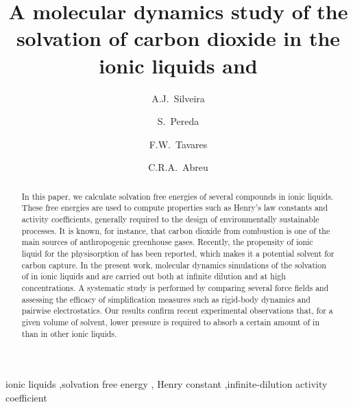 \documentclass[3p,twocolumn]{elsarticle}
\begin{document}
\begin{frontmatter}

\title{A molecular dynamics study of the solvation of carbon dioxide in the ionic liquids \ce{[emim][B(CN)_4]} and \ce{[emim][NTf_2]}}

\author[plapiqui,msk]{A.J.~Silveira}
\author[plapiqui]{S.~Pereda}
\author[eq-ufrj,coppe-ufrj]{F.W.~Tavares}
\author[eq-ufrj]{C.R.A.~Abreu}

\address[plapiqui]{Planta Piloto de Ingenier\'ia Qu\'imica (PLAPIQUI), Universidad Nacional del Sur, Bah\'ia Blanca, Argentina}
\address[msk]{Computational \& Systems Biology Program, Memorial Sloan Kettering Cancer Center, New York, NY, USA}
\address[eq-ufrj]{Chemical Engineering Department, Escola de Qu\'imica, Universidade Federal do Rio de Janeiro, Rio de Janeiro, Brazil}
\address[coppe-ufrj]{Chemical Engineering Program, Alberto Luiz Coimbra Institute for Graduate Studies and Research in Engineering (COPPE), Universidade Federal do Rio de Janeiro, Rio de Janeiro, Brazil}


\begin{abstract}
In this paper, we calculate solvation free energies of several compounds in ionic liquids.
These free energies are used to compute properties such as Henry's law constants and activity coefficients, generally required to the design of environmentally sustainable processes.
It is known, for instance, that carbon dioxide from combustion is one of the main sources of anthropogenic greenhouse gases.
Recently, the propensity of ionic liquid \ce{[emim][B(CN)_4]} for the physisorption of  has been reported, which makes it a potential solvent for carbon capture.
In the present work, molecular dynamics simulations of the solvation of  in ionic liquids \ce{[emim][B(CN)_4]} and \ce{[emim][NTf_2]} are carried out both at infinite dilution and at high concentrations.
A systematic study is performed by comparing several force fields and assessing the efficacy of simplification measures such as rigid-body dynamics and pairwise electrostatics.
Our results confirm recent experimental observations that, for a given volume of solvent, lower pressure is required to absorb a certain amount of  in \ce{[emim][B(CN)_4]} than in other ionic liquids.
\end{abstract}

\begin{keyword}
ionic liquids \sep solvation free energy \sep  {} Henry constant \sep infinite-dilution activity coefficient 
\end{keyword}

\end{frontmatter}
\end{document}
